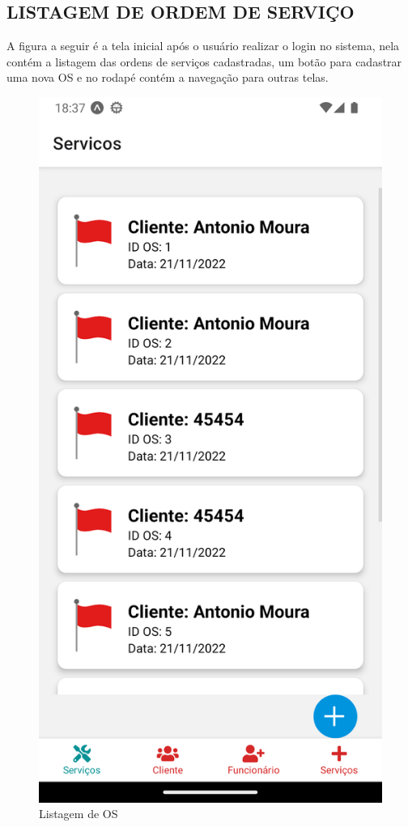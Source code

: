 \subsection{LISTAGEM DE ORDEM DE SERVIÇO}
A figura a seguir é a tela inicial após o usuário realizar o login no sistema, nela contém a listagem das ordens de serviços cadastradas, um botão para cadastrar uma nova OS e no rodapé contém a navegação para outras telas.
\begin{figure}[htb]
	\caption{\label{fig_diagrama-classes} Listagem de OS}
	\begin{center}
	    \includegraphics[width=0.5\linewidth]{imagens/listagemOS.png}
	\end{center}
\end{figure}

\newpage

